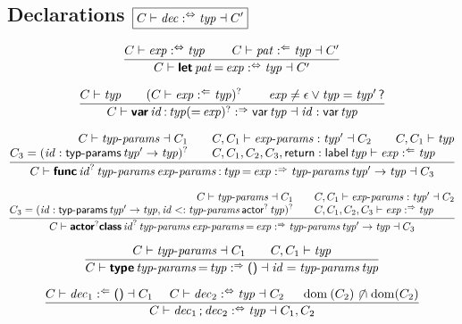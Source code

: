 \subsection*{Declarations \hfill $\boxed{C \vdash \operatorname{\mathit{dec}} :^\Leftrightarrow \operatorname{\mathit{typ}} \dashv C'}$}

$$
\frac{
  C \vdash \operatorname{\mathit{exp}} :^\Leftrightarrow \operatorname{\mathit{typ}}
  \qquad
  C \vdash \operatorname{\mathit{pat}} :^\Leftarrow \operatorname{\mathit{typ}} \dashv C'
}{
  C \vdash \textsf{\sf\textbf{let}} \operatorname{\mathit{pat}} \textsf{\sf=} \operatorname{\mathit{exp}} :^\Leftrightarrow \operatorname{\mathit{typ}} \dashv C'
}
$$

$$
\frac{
  C \vdash \operatorname{\mathit{typ}}
  \qquad
  (C \vdash \operatorname{\mathit{exp}} :^\Leftarrow \operatorname{\mathit{typ}})^?
  \qquad
  \operatorname{\mathit{exp}} \neq \epsilon \vee \operatorname{\mathit{typ}} = \operatorname{\mathit{typ}}' \textsf{\sf?}
}{
  C \vdash \textsf{\sf\textbf{var}} \operatorname{\mathit{id}} \textsf{\sf:} \operatorname{\mathit{typ}} (\textsf{\sf=} \operatorname{\mathit{exp}})^? :^\Rightarrow \textsf{\sf var} \operatorname{\mathit{typ}} \dashv \operatorname{\mathit{id}} : \textsf{\sf var} \operatorname{\mathit{typ}}
}
$$

$$
\frac{
  \begin{array}{@{}r@{\qquad}l@{}}
  C \vdash \x{typ-params} \dashv C_1
  &
  C, C_1 \vdash \x{exp-params} : \x{typ}' \dashv C_2
  \qquad
  C, C_1 \vdash \x{typ}
  \\
  C_3 = (\x{id} : \K{typ-params} \x{typ}' \Kto \x{typ})^?
  &
  C, C_1, C_2, C_3, \K{return} : \K{label} \x{typ} \vdash \x{exp} \anal \x{typ}
  \end{array}
}{
  C \vdash \KK{func} \x{id}^? \x{typ-params} \x{exp-params} \K: \x{typ} \K= \x{exp} \synth \x{typ-params} \x{typ}' \Kto \x{typ} \dashv C_3
}
$$

$$
\frac{
  \begin{array}{@{}r@{\qquad}l@{}}
  C \vdash \x{typ-params} \dashv C_1
  &
  C, C_1 \vdash \x{exp-params} : \x{typ}' \dashv C_2
  \\
  C_3 = (\x{id} : \K{typ-params} \x{typ}' \Kto \x{typ}, \x{id} <: \x{typ-params} \K{actor}^? \x{typ})^?
  &
  C, C_1, C_2, C_3 \vdash \x{exp} \synth \x{typ}
  \end{array}
}{
  C \vdash \KK{actor}^? \KK{class} \x{id}^? \x{typ-params} \x{exp-params} \K= \x{exp} \synth \x{typ-params} \x{typ}' \Kto \x{typ} \dashv C_3
}
$$

$$
\frac{
  C \vdash \operatorname{\mathit{typ-params}} \dashv C_1
  \qquad
  C, C_1 \vdash \operatorname{\mathit{typ}}
}{
  C \vdash \textsf{\sf\textbf{type}} \operatorname{\mathit{typ-params}} \textsf{\sf=} \operatorname{\mathit{typ}} :^\Rightarrow \textsf{\sf()} \dashv \operatorname{\mathit{id}} = \operatorname{\mathit{typ-params}} \operatorname{\mathit{typ}}
}
$$

$$
\frac{
  C \vdash \x{dec}_1 \anal \K{()} \dashv C_1
  \quad~
  C \vdash \x{dec}_2 \analsynth \x{typ} \dashv C_2
  \quad~
  \Dom(C_2) \setdisj \Dom(C_2)
}{
  C \vdash \x{dec}_1 \K; \x{dec}_2 \analsynth \x{typ} \dashv C_1, C_2
}
$$
